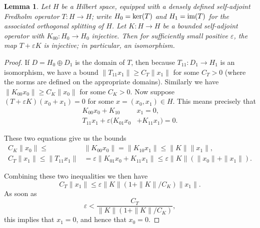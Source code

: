 \documentclass[10pt,a4paper]{amsart}
\newtheorem{lemma}[theorem]{Lemma}
\theoremstyle{definition}
\theoremstyle{remark}
\numberwithin{figure}{qchap}
\begin{document}
\begin{lemma}\label{cpert}Let $H$ be a Hilbert space, equipped with a densely defined self-adjoint Fredholm operator $T: H \to H$; write $H_0 = \textup{ker}(T)$ and $H_1 = \textup{im}(T)$ for the associated orthogonal splitting of $H$. Let $K: H \to H$ be a bounded self-adjoint operator with $K_{00}: H_0 \to H_0$ injective. Then for sufficiently small positive $\varepsilon$, the map $T + \varepsilon K$ is injective; in particular, an isomorphism. 
\end{lemma}
\begin{proof}If $D = H_0 \oplus D_1$ is the domain of $T$, then because $T_{11}: D_1 \to H_1$ is an isomorphism, we have a bound $\|T_{11} x_1\| \geq C_T \|x_1\|$ for some $C_T > 0$ (where the norms are defined on the appropriate domains). Similarly we have $\|K_{00} x_0\| \geq C_K \|x_0\|$ for some $C_K > 0$. Now suppose $(T + \varepsilon K)(x_0 + x_1) = 0$ for some $x = (x_0, x_1) \in H$. This means precisely that 
\begin{align*}K_{00} x_0 + K_{10} &x_1 = 0,\\
T_{11} x_1 + \varepsilon (K_{01} x_0 &+ K_{11} x_1) = 0.
\end{align*}

These two equations give us the bounds 
\begin{align*}
C_K \|x_0\| \leq &\|K_{00} x_0\| = \|K_{10} x_1\| \leq \|K\| \|x_1\|,\\
C_T \|x_1\| \leq \|T_{11} x_1\| &= \varepsilon \|K_{01} x_0 + K_{11} x_1\| \leq \varepsilon\|K\|(\|x_0\| + \|x_1\|).
\end{align*}

Combining these two inequalities we then have $$C_T \|x_1\| \leq \varepsilon \|K\| (1 + \|K\|/C_K) \|x_1\|.$$ As soon as $$\varepsilon < \frac{C_T}{\|K\| (1 + \|K\|/C_K)},$$ this implies that $x_1 = 0$, and hence that $x_0 = 0$. 
\end{proof}
\end{document}
